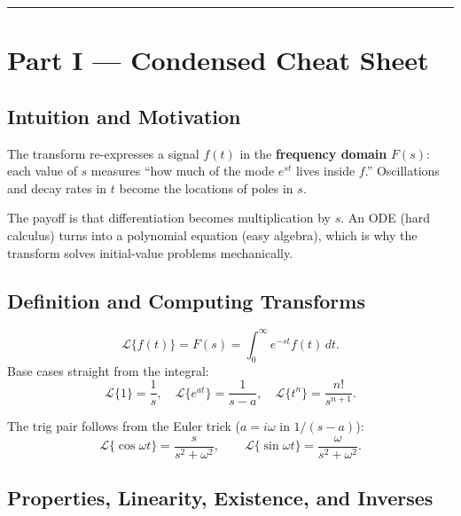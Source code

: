 \vspace{0.6em}
\hrule
\vspace{0.6em}

{}
\section*{Part I --- Condensed Cheat Sheet}
\setcounter{section}{12}   %

\subsection{Intuition and Motivation}

The transform re-expresses a signal $f(t)$ in the \textbf{frequency domain} $F(s)$:
each value of $s$ measures ``how much of the mode $e^{st}$ lives inside $f$.''
Oscillations and decay rates in $t$ become the locations of poles in $s$.

\begin{conceptbox}
The payoff is that \textcolor{accentorange}{differentiation becomes multiplication by
$s$}. An ODE (hard calculus) turns into a polynomial equation (easy algebra), which
is why the transform solves initial-value problems mechanically.
\end{conceptbox}

\subsection{Definition and Computing Transforms}

\begin{formulabox}
\[ \mathcal{L}\{f(t)\} = F(s) = \int_{0}^{\infty} e^{-st} f(t)\,dt. \]
Base cases straight from the integral:
\[ \mathcal{L}\{1\}=\frac{1}{s}, \quad \mathcal{L}\{e^{at}\}=\frac{1}{s-a}, \quad
   \mathcal{L}\{t^n\}=\frac{n!}{s^{n+1}}. \]
\end{formulabox}

The trig pair follows from the Euler trick ($a=i\omega$ in $1/(s-a)$):
\[ \mathcal{L}\{\cos\omega t\}=\frac{s}{s^2+\omega^2}, \qquad
   \mathcal{L}\{\sin\omega t\}=\frac{\omega}{s^2+\omega^2}. \]

\subsection{Properties, Linearity, Existence, and Inverses}

